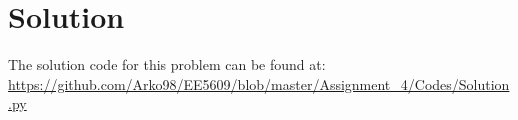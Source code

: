 \documentclass[journal,12pt,twocolumn]{IEEEtran}
\begin{document}
\section{Solution}
The solution code for this problem can be found at: \url{https://github.com/Arko98/EE5609/blob/master/Assignment_4/Codes/Solution.py}
\begin{comment}
The equation in the problem can be modified as follows
\begin{align}
\vec{A^3}-6\vec{A^2}+7\vec{A}+2\vec{I}&=0\\
\implies\vec{A^2}(\vec{A^}-6\vec{I})+7\vec{A}+2\vec{I}&=0\label{eq1}
\end{align}
So we need to prove equation \ref{eq1}. Now, at first we calculate the value of $\vec{A^2}$ as follows
\begin{align}
\vec{A^2}&=\vec{A}\cdot\vec{A}\\
\implies\vec{A^2}&=\vec{A^T}\vec{A}\\
\implies\vec{A^2}&=\myvec{1&0&2\\0&2&0\\2&1&3}\myvec{1&0&2\\0&2&1\\2&0&3}\\
\implies\vec{A^2}&=\myvec{5&0&8\\2&4&5\\8&0&13}\label{eq2}
\end{align}
Next we calculate, $\vec{A}-6\vec{I}$ where I is identity matrix of order 3, as follows
\begin{align}
\vec{A}-6\vec{I}&=\myvec{1&0&2\\0&2&1\\2&0&3} - 6\myvec{1&0&0\\0&1&0\\0&0&1}\\
\implies\vec{A}-6\vec{I}&=\myvec{1&0&2\\0&2&1\\2&0&3} - \myvec{6&0&0\\0&6&0\\0&0&6}\\
\implies\vec{A}-6\vec{I}&=\myvec{-5&0&2\\0&-4&1\\2&0&-3}\label{eq3}
\end{align}
Now we compute $\vec{A^2}(\vec{A}-6\vec{I})$ by putting values of $\vec{A^2}$ from equation \ref{eq2} and value of $\vec{A}-6\vec{I}$ from \ref{eq3} as follows
\begin{align}
\vec{A^2}\cdot(\vec{A}-6\vec{I})&=\vec{(A^2)^T}(\vec{A}-6\vec{I})\\

\end{comment}
\end{document}
